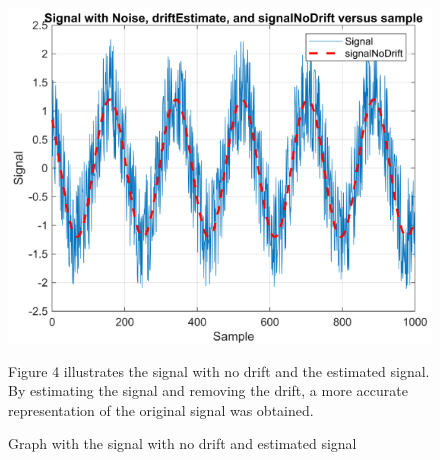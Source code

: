 \documentclass[journal]{IEEEtran}
\begin{document}
\begin{figure}[ht] %
    \centering
    \includegraphics[width=\linewidth]{4.2 plot.png}
    \caption{Graph with the signal with no drift and estimated signal}
    \vspace{1em} %
    \begin{minipage}{\linewidth}
        \small
        Figure 4 illustrates the signal with no drift and the estimated signal. By estimating the signal and removing the drift, a more accurate representation of the original signal was obtained.
    \end{minipage}
    \label{Part 4: Estimated Signal Graph}
\end{figure}
\end{document}
